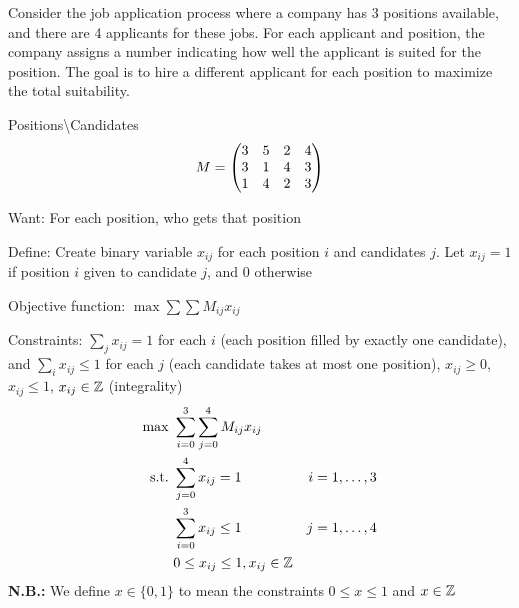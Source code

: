 \documentclass[class=co250,tikz,notes]{agony}
\begin{document}
\begin{example}
  Consider the job application process where a company has 3 positions available, and there are 4 applicants for these jobs. For each applicant and position, the company assigns a number indicating how well the applicant is suited for the position. The goal is to hire a different applicant for each position to maximize the total suitability.

  Positions\backslash Candidates
  \[ M=\mqty(3&5&2&4 \\ 3&1&4&3 \\ 1&4&2&3) \]
\end{example}
\begin{sol}
  Want: For each position, who gets that position

  Define: Create binary variable $x_{ij}$ for each position $i$ and candidates $j$. Let $x_{ij} = 1$ if position $i$ given to candidate $j$, and $0$ otherwise

  Objective function: $\max \sum\sum M_{ij}x_{ij}$

  Constraints: $\sum_{j} x_{ij} = 1$ for each $i$ (each position filled by exactly one candidate), and $\sum_i x_{ij} \leq 1$ for each $j$  (each candidate takes at most one position), $x_{ij} \geq 0$, $x_{ij} \leq 1$, $x_{ij} \in \mathbb{Z}$ (integrality)
  \begin{align*}\max\ & \sum_{i=0}^3\sum_{j=0}^4 M_{ij}x_{ij} \\ \text{s.t.}\ & \sum_{j=0}^4 x_{ij} = 1 & i = 1,\dotsc,3 \\ &\sum_{i=0}^3 x_{ij} \leq 1 & j = 1,\dotsc,4 \\ & 0 \leq x_{ij} \leq 1, x_{ij} \in \mathbb{Z}\end{align*}
  \textbf{N.B.:} We define $x \in \{0,1\}$ to mean the constraints $0 \leq x \leq 1$ and $x \in \mathbb{Z}$
\end{sol}
\end{document}
